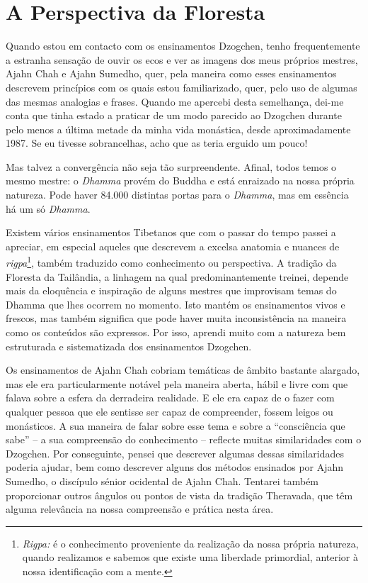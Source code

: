 \chapter{A Perspectiva da Floresta}

Quando estou em contacto com os ensinamentos Dzogchen, tenho
frequentemente a estranha sensação de ouvir os ecos e ver as imagens dos
meus próprios mestres, Ajahn Chah e Ajahn Sumedho, quer, pela maneira
como esses ensinamentos descrevem princípios com os quais estou
familiarizado, quer, pelo uso de algumas das mesmas analogias e frases.
Quando me apercebi desta semelhança, dei-me conta que tinha estado a
praticar de um modo parecido ao Dzogchen durante pelo menos a última
metade da minha vida monástica, desde aproximadamente 1987. Se eu
tivesse sobrancelhas, acho que as teria erguido um pouco!

Mas talvez a convergência não seja tão surpreendente. Afinal, todos
temos o mesmo mestre: o \emph{Dhamma} provém do Buddha e está enraizado
na nossa própria natureza. Pode haver 84.000 distintas portas para o
\emph{Dhamma}, mas em essência há um só \emph{Dhamma}.

Existem vários ensinamentos Tibetanos que com o passar do tempo passei a
apreciar, em especial aqueles que descrevem a excelsa anatomia e nuances
de \emph{rigpa}\footnote{%
\emph{Rigpa:} é o conhecimento proveniente da realização da
nossa própria natureza, quando realizamos e sabemos que existe uma
liberdade primordial, anterior à nossa identificação com a mente.
}, também traduzido como conhecimento ou perspectiva.
A tradição da Floresta da Tailândia, a linhagem na qual
predominantemente treinei, depende mais da eloquência e inspiração de
alguns mestres que improvisam temas do Dhamma que lhes ocorrem no
momento. Isto mantém os ensinamentos vivos e frescos, mas também
significa que pode haver muita inconsistência na maneira como os
conteúdos são expressos. Por isso, aprendi muito com a natureza bem
estruturada e sistematizada dos ensinamentos Dzogchen.

Os ensinamentos de Ajahn Chah cobriam temáticas de âmbito bastante alargado, mas ele era
particularmente notável pela maneira aberta, hábil e livre com que
falava sobre a esfera da derradeira realidade. E ele era capaz de o
fazer com qualquer pessoa que ele sentisse ser capaz de compreender,
fossem leigos ou monásticos. A sua maneira de falar sobre esse tema e
sobre a ``consciência que sabe'' -- a sua compreensão do conhecimento
-- reflecte muitas similaridades com o Dzogchen. Por conseguinte, pensei
que descrever algumas dessas similaridades poderia ajudar, bem como
descrever alguns dos métodos ensinados por Ajahn Sumedho, o discípulo
sénior ocidental de Ajahn Chah. Tentarei também proporcionar outros
ângulos ou pontos de vista da tradição Theravada, que têm alguma
relevância na nossa compreensão e prática nesta área.

